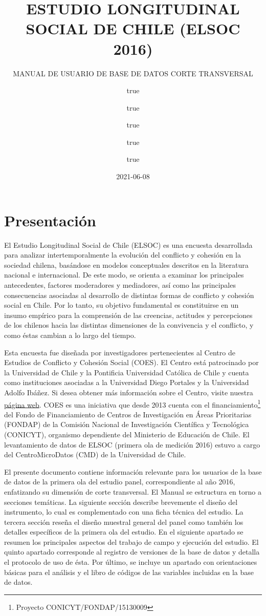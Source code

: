 \documentclass[
]{book}
\title{ESTUDIO LONGITUDINAL SOCIAL DE CHILE (ELSOC 2016)}
\subtitle{MANUAL DE USUARIO DE BASE DE DATOS CORTE TRANSVERSAL}
\author{true \and true \and true \and true \and true}
\date{2021-06-08}
\begin{document}
\frontmatter
\maketitle

\mainmatter
\hypertarget{present}{%
\chapter{Presentación}\label{present}}

El Estudio Longitudinal Social de Chile (ELSOC) es una encuesta
desarrollada para analizar intertemporalmente la evolución del conflicto
y cohesión en la sociedad chilena, basándose en modelos conceptuales
descritos en la literatura nacional e internacional. De este modo, se
orienta a examinar los principales antecedentes, factores moderadores y
mediadores, así como las principales consecuencias asociadas al
desarrollo de distintas formas de conflicto y cohesión social en Chile.
Por lo tanto, su objetivo fundamental es constituirse en un insumo
empírico para la comprensión de las creencias, actitudes y percepciones
de los chilenos hacia las distintas dimensiones de la convivencia y el
conflicto, y como éstas cambian a lo largo del tiempo.

Esta encuesta fue diseñada por investigadores pertenecientes al Centro
de Estudios de Conflicto y Cohesión Social (COES). El Centro está
patrocinado por la Universidad de Chile y la Pontificia Universidad
Católica de Chile y cuenta como instituciones asociadas a la Universidad
Diego Portales y la Universidad Adolfo Ibáñez. Si desea obtener más
información sobre el Centro, visite nuestra
\href{http://www.coes.cl/}{página web}. COES es una iniciativa que desde
2013 cuenta con el financiamiento\footnote{Proyecto
  CONICYT/FONDAP/15130009} del Fondo de Financiamiento de Centros de
Investigación en Áreas Prioritarias (FONDAP) de la Comisión Nacional de
Investigación Científica y Tecnológica (CONICYT), organismo dependiente
del Ministerio de Educación de Chile. El levantamiento de datos de ELSOC
(primera ola de medición 2016) estuvo a cargo del CentroMicroDatos (CMD)
de la Universidad de Chile.

El presente documento contiene información relevante para los usuarios
de la base de datos de la primera ola del estudio panel, correspondiente
al año 2016, enfatizando su dimensión de corte transversal. El Manual se
estructura en torno a secciones temáticas. La siguiente sección describe
brevemente el diseño del instrumento, lo cual es complementado con una
ficha técnica del estudio. La tercera sección reseña el diseño muestral
general del panel como también los detalles específicos de la primera
ola del estudio. En el siguiente apartado se resumen los principales
aspectos del trabajo de campo y ejecución del estudio. El quinto
apartado corresponde al registro de versiones de la base de datos y
detalla el protocolo de uso de ésta. Por último, se incluye un apartado
con orientaciones básicas para el análisis y el libro de códigos de las
variables incluidas en la base de datos.

\backmatter
\end{document}
